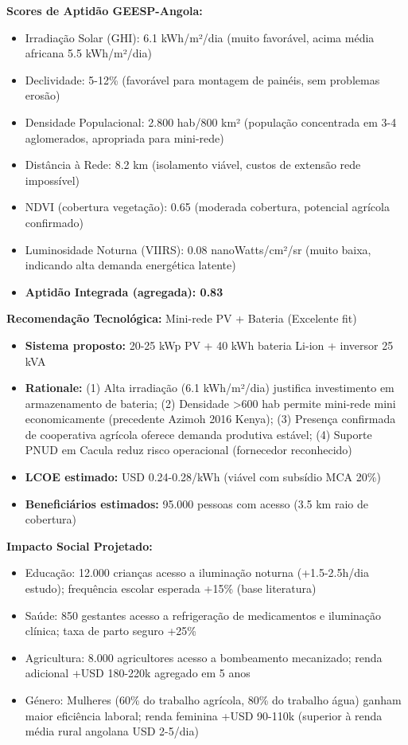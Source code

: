 \documentclass[12pt, a4paper]{article}
\begin{document}
\textbf{Scores de Aptidão GEESP-Angola:}
\begin{itemize}
\item Irradiação Solar (GHI): 6.1 kWh/m²/dia (muito favorável, acima média africana 5.5 kWh/m²/dia)
\item Declividade: 5-12\% (favorável para montagem de painéis, sem problemas erosão)
\item Densidade Populacional: 2.800 hab/800 km² (população concentrada em 3-4 aglomerados, apropriada para mini-rede)
\item Distância à Rede: 8.2 km (isolamento viável, custos de extensão rede impossível)
\item NDVI (cobertura vegetação): 0.65 (moderada cobertura, potencial agrícola confirmado)
\item Luminosidade Noturna (VIIRS): 0.08 nanoWatts/cm²/sr (muito baixa, indicando alta demanda energética latente)
\item \textbf{Aptidão Integrada (agregada): 0.83}
\end{itemize}

\textbf{Recomendação Tecnológica:}
Mini-rede PV + Bateria (Excelente fit)
\begin{itemize}
\item \textbf{Sistema proposto:} 20-25 kWp PV + 40 kWh bateria Li-ion + inversor 25 kVA
\item \textbf{Rationale:} (1) Alta irradiação (6.1 kWh/m²/dia) justifica investimento em armazenamento de bateria; (2) Densidade >600 hab permite mini-rede mini economicamente (precedente Azimoh 2016 Kenya); (3) Presença confirmada de cooperativa agrícola oferece demanda produtiva estável; (4) Suporte PNUD em Cacula reduz risco operacional (fornecedor reconhecido)
\item \textbf{LCOE estimado:} USD 0.24-0.28/kWh (viável com subsídio MCA 20\%)
\item \textbf{Beneficiários estimados:} 95.000 pessoas com acesso (3.5 km raio de cobertura)
\end{itemize}

\textbf{Impacto Social Projetado:}
\begin{itemize}
\item Educação: 12.000 crianças acesso a iluminação noturna (+1.5-2.5h/dia estudo); frequência escolar esperada +15\% (base literatura)
\item Saúde: 850 gestantes acesso a refrigeração de medicamentos e iluminação clínica; taxa de parto seguro +25\%
\item Agricultura: 8.000 agricultores acesso a bombeamento mecanizado; renda adicional +USD 180-220k agregado em 5 anos
\item Género: Mulheres (60\% do trabalho agrícola, 80\% do trabalho água) ganham maior eficiência laboral; renda feminina +USD 90-110k (superior à renda média rural angolana USD 2-5/dia)
\end{itemize}
\end{document}
